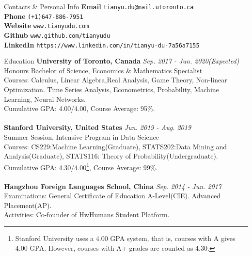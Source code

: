 \documentclass{resume} %
\begin{document}

\begin{rSection}{Contacts \& Personal Info}
	\textbf{Email} \texttt{tianyu.du@mail.utoronto.ca}
	\\
	\textbf{Phone} \texttt{(+1)647-886-7951}
	\\
	\textbf{Website} \texttt{www.tianyudu.com}
	\\
	\textbf{Github} \texttt{www.github.com/tianyudu}
	\\
	\textbf{LinkedIn} \texttt{https://www.linkedin.com/in/tianyu-du-7a56a7155}
\end{rSection}


\begin{rSection}{Education}
{\bf University of Toronto, Canada} \hfill {\em Sep. 2017 - Jun. 2020(Expected)} 
\\ Honours Bachelor of Science, Economics \& Mathematics Specialist
\\ Courses: Calculus, Linear Algebra,Real Analysis, Game Theory, Non-linear Optimization. Time Series Analysis, Econometrics, Probability, Machine Learning, Neural Networks.
\\ Cumulative GPA: 4.00/4.00, Course Average: 95\%.
\\
\\{\bf Stanford University, United States} \hfill {\em Jun. 2019 - Aug. 2019} 
\\ Summer Session, Intensive Program in Data Science
\\ Courses: CS229:Machine Learning(Graduate), STATS202:Data Mining and Analysis(Graduate), STATS116: Theory of Probability(Undergraduate).
\\ Cumulative GPA: 4.30/4.00\footnote{Stanford University uses a 4.00 GPA system, that is, courses with A gives 4.00 GPA. However, courses with A+ grades are counted as 4.30.}, Course Average: 99\%.
\\
\\{\bf Hangzhou Foreign Languages School, China} \hfill {\em Sep. 2014 - Jun. 2017} 
\\ Examinations: General Certificate of Education A-Level(CIE). Advanced Placement(AP).
\\ Activities: Co-founder of HwHumans Student Platform.
\end{rSection}
\end{document}
